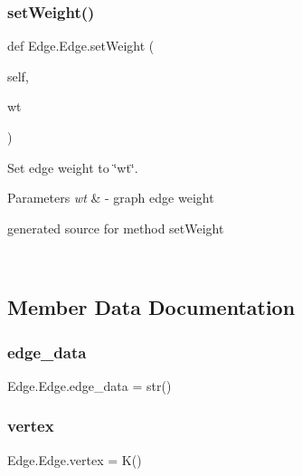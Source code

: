 \subsubsection{\texorpdfstring{set\+Weight()}{setWeight()}}
{\footnotesize\ttfamily def Edge.\+Edge.\+set\+Weight (\begin{DoxyParamCaption}\item[{}]{self,  }\item[{}]{wt }\end{DoxyParamCaption})}



Set edge weight to \char`\"{}wt\char`\"{}. 


\begin{DoxyParams}{Parameters}
{\em wt} & -\/ graph edge weight\begin{DoxyVerb}generated source for method setWeight \end{DoxyVerb}
 \\
\hline
\end{DoxyParams}


\subsection{Member Data Documentation}
\hypertarget{class_edge_1_1_edge_a7c92348b4e8e4f5027bc2fd230e353e7}{}\label{class_edge_1_1_edge_a7c92348b4e8e4f5027bc2fd230e353e7} 
\subsubsection{\texorpdfstring{edge\+\_\+data}{edge\_data}}
{\footnotesize\ttfamily Edge.\+Edge.\+edge\+\_\+data = str()\hspace{0.3cm}{\ttfamily [static]}}

\hypertarget{class_edge_1_1_edge_a024c98580ed6649429e1996725333c7b}{}\label{class_edge_1_1_edge_a024c98580ed6649429e1996725333c7b} 
\subsubsection{\texorpdfstring{vertex}{vertex}}
{\footnotesize\ttfamily Edge.\+Edge.\+vertex = K()\hspace{0.3cm}{\ttfamily [static]}}

\hypertarget{class_edge_1_1_edge_a0f1b80578fe4bafb45c269111bf9822c}{}\label{class_edge_1_1_edge_a0f1b80578fe4bafb45c269111bf9822c} 
